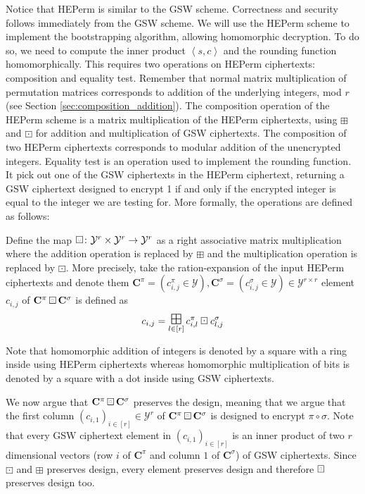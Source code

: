 Notice that HEPerm is similar to the GSW scheme. Correctness and security follows immediately from the GSW scheme. We will use the HEPerm scheme to implement the bootstrapping algorithm, allowing homomorphic decryption. To do so, we need to compute the inner product $\left \langle s,c \right \rangle$ and the rounding function homomorphically. This requires two operations on HEPerm ciphertexts: composition and equality test. Remember that normal matrix multiplication of permutation matrices corresponds to addition of the underlying integers, mod $r$ (see Section \ref{sec:composition_addition}). The composition operation of the HEPerm scheme is a matrix multiplication of the HEPerm ciphertexts, using $\boxplus$ and $\boxdot$ for addition and multiplication of GSW ciphertexts. The composition of two HEPerm ciphertexts corresponds to modular addition of the unencrypted integers. Equality test is an operation used to implement the rounding function. It pick out one of the GSW ciphertexts in the HEPerm ciphertext, returning a GSW ciphertext designed to encrypt 1 if and only if the encrypted integer is equal to the integer we are testing for. More formally, the operations are defined as follows:
\begin{definition}
    Define the map $\boxring \colon \mathcal{Y}^{r} \times \mathcal{Y}^{r} \to \mathcal{Y}^{r}$ as a right associative matrix multiplication where the addition operation is replaced by $\boxplus$ and the multiplication operation is replaced by $\boxdot$. More precisely, take the ration-expansion of the input HEPerm ciphertexts and denote them $\mathbf{C}^{\pi} = (c_{i,j}^{\pi} \in \mathcal{Y}), \mathbf{C}^{\sigma} = (c_{i,j}^{\sigma} \in \mathcal{Y}) \in \mathcal{Y}^{r \times r}$ element $c_{i,j}$ of $\mathbf{C}^{\pi} \boxring \mathbf{C}^{\sigma}$ is defined as
    \begin{equation}\label{HEPerm_composition}
        c_{i,j} = \bigboxplus\limits_{l \in [r]} c_{i,l}^{\pi} \boxdot c_{l,j}^{\sigma}
    \end{equation}
\end{definition}
\begin{remark}
    Note that homomorphic addition of integers is denoted by a square with a ring inside using HEPerm ciphertexts whereas homomorphic multiplication of bits is denoted by a square with a dot inside using GSW ciphertexts.
\end{remark}
We now argue that $\mathbf{C}^{\pi} \boxring \mathbf{C}^{\sigma}$ preserves the design, meaning that we argue that the first column $(c_{i,1})_{i \in [r]} \in \mathcal{Y}^r$ of $\mathbf{C}^{\pi} \boxring \mathbf{C}^{\sigma}$ is designed to encrypt $\pi \circ \sigma$. Note that every GSW ciphertext element in $(c_{i,1})_{i \in [r]}$ is an inner product of two $r$ dimensional vectors (row $i$ of $\mathbf{C}^{\pi}$ and column $1$ of $\mathbf{C}^{\sigma}$) of GSW ciphertexts. Since $\boxdot$ and $\boxplus$ preserves design, every element preserves design and therefore $\boxring$ preserves design too. 

